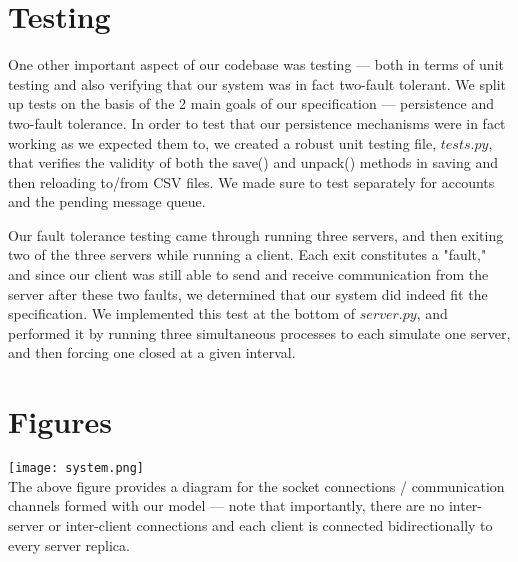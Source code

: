 \documentclass[
	a4paper, %
	10pt, %
	unnumberedsections, %
	twoside, %
]{LTJournalArticle}
\begin{document}
\section{Testing}

One other important aspect of our codebase was testing --- both in terms of unit testing and also verifying that our system was in fact two-fault tolerant. We split up tests on the basis of the 2 main goals of our specification --- persistence and two-fault tolerance. In order to test that our persistence mechanisms were in fact working as we expected them to, we created a robust unit testing file, $tests.py$, that verifies the validity of both the save() and unpack() methods in saving and then reloading to/from CSV files. We made sure to test separately for accounts and the pending message queue. 

Our fault tolerance testing came through running three servers, and then exiting two of the three servers while running a client. Each exit constitutes a "fault," and since our client was still able to send and receive communication from the server after these two faults, we determined that our system did indeed fit the specification. We implemented this test at the bottom of $server.py$, and performed it by running three simultaneous processes to each simulate one server, and then forcing one closed at a given interval.

\section{Figures}

\texttt{[image: system.png]} \\
The above figure provides a diagram for the socket connections / communication channels formed with our model --- note that importantly, there are no inter-server or inter-client connections and each client is connected bidirectionally to every server replica.
\end{document}
